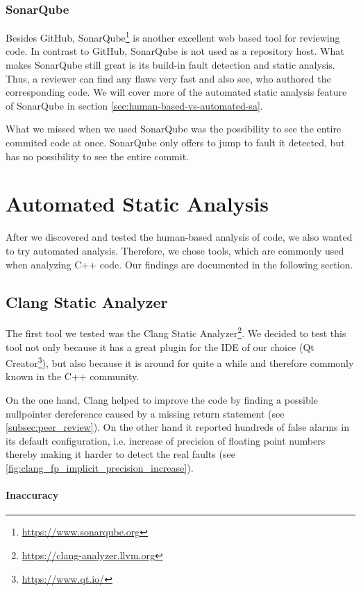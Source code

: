 \documentclass{scrreprt}
\begin{document}
\subsubsection{SonarQube}

Besides GitHub, SonarQube\footnote{\url{https://www.sonarqube.org}} is another excellent web based tool for reviewing code. In contrast to GitHub, SonarQube is not used as a repository host. What makes SonarQube still great is its build-in fault detection and static analysis. Thus, a reviewer can find any flaws very fast and also see, who authored the corresponding code. We will cover more of the automated static analysis feature of SonarQube in section \ref{sec:human-based-vs-automated-sa}.

What we missed when we used SonarQube was the possibility to see the entire commited code at once. SonarQube only offers to jump to fault it detected, but has no possibility to see the entire commit.

\section{Automated Static Analysis}

After we discovered and tested the human-based analysis of code, we also wanted to try automated analysis. Therefore, we chose tools, which are commonly used when analyzing C++ code. Our findings are documented in the following section.

\subsection{Clang Static Analyzer}

The first tool we tested was the Clang Static Analyzer\footnote{\url{https://clang-analyzer.llvm.org}}. We decided to test this tool not only because it has a great plugin for the IDE of our choice (Qt Creator\footnote{\url{https://www.qt.io/}}), but also because it is around for quite a while and therefore commonly known in the C++ community.

On the one hand, Clang helped to improve the code by finding a possible nullpointer dereference caused by a missing return statement (see \vref{subsec:peer_review}). 
On the other hand it reported hundreds of false alarms in its default configuration, i.e. increase of precision of floating point numbers thereby making it harder to detect the real faults (see \vref{fig:clang_fp_implicit_precision_increase}).

\paragraph{Inaccuracy}
\end{document}
